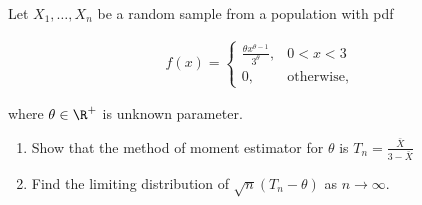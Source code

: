 
\begin{exercise}

Let $X_1,\dots,X_n$ be a random sample from a population with pdf

\begin{align*}
  f(x) = \begin{cases}
    \frac{\theta x^{\theta - 1}}{3^\theta}, & 0 < x < 3 \\
    0, & \text{otherwise},
  \end{cases}
\end{align*}

where $\theta \in \R^+$ is unknown parameter.

\begin{enumerate}[label=(\alph*)]
  \item Show that the method of moment estimator for $\theta$ is $T_n = \frac{\bar{X}}{3 - \bar{X}}$
  \item Find the limiting distribution of $\sqrt{n}(T_n - \theta)$ as $n \to \infty$.
\end{enumerate}

\end{exercise}


